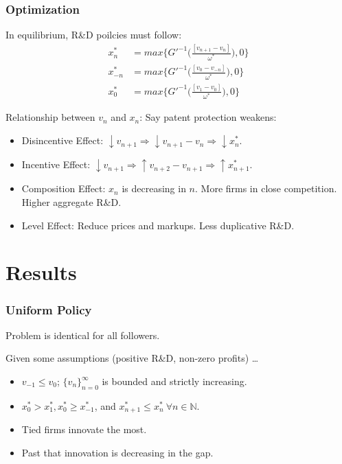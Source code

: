\documentclass{beamer}
\begin{document}
\begin{frame}[t]\frametitle{Optimization} 
  In equilibrium, R\&D poilcies must follow:
  \begin{align*} \label{eq:ss_rd_policies}
    x_n^*    &= max \big\{G'^{-1}\Bigg(\frac{[v_{n+1} - v_n]}{\omega^*}\Bigg)   ,0\}\\
    x_{-n}^* &= max \big\{G'^{-1}\Bigg(\frac{[v_0  - v_{-n}]}{\omega^*}\Bigg)   ,0\}\\
    x_0^*    &= max \big\{G'^{-1}\Bigg(\frac{[v_1     - v_0]}{\omega^*}\Bigg)   ,0\}
  \end{align*}

  Relationship between $v_n$ and $x_n$: Say patent protection weakens:
  \begin{itemize}
    \item<2-> Disincentive Effect: $\downarrow v_{n+1} \Rightarrow \downarrow v_{n+1} - v_n \Rightarrow \downarrow x_n^*$.
    \item<3-> Incentive Effect: $\downarrow v_{n+1} \Rightarrow \uparrow v_{n+2} - v_{n+1} \Rightarrow \uparrow x_{n+1}^*$.
    \item<4-> Composition Effect: $x_n$ is decreasing in $n$. More firms in close competition. Higher aggregate R\&D.
    \item<5-> Level Effect: Reduce prices and markups.  Less duplicative R\&D.
  \end{itemize}
\end{frame}

\section{Results}
\label{sec:results}
\begin{frame}[t]\frametitle{Uniform Policy} 
Problem is identical for all followers.

Given some assumptions (positive R\&D, non-zero profits) \ldots
\begin{itemize}
  \item<+-> $v_{-1} \leq v_0$; $\{v_n\}_{n=0}^{\infty}$ is bounded and strictly increasing.
  \item<+-> $x_0^* > x_1^*, x_0^* \geq x_{-1}^*$, and $x_{n+1}^* \leq x_n^*\ \forall n \in \mathbb{N}$.
  \item<2> Tied firms innovate the most.
  \item<2> Past that innovation is decreasing in the gap.
\end{itemize}
\end{frame}
\end{document}

